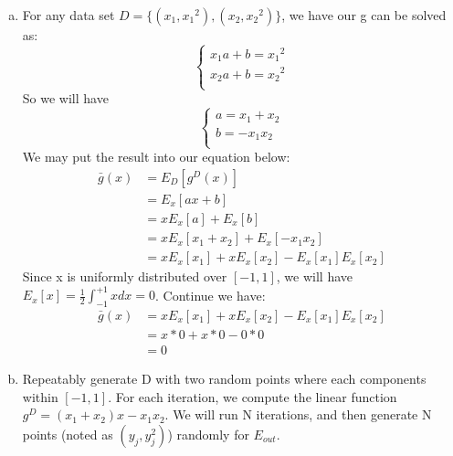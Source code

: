 \documentclass{article}
\def\math#1{$#1$}
\begin{document}
\begin{enumerate}[a)]
    \item For any data set \math{D = \{(x_1, {x_1}^2), (x_2, {x_2}^2)\}}, we have our g can be solved as:
         \begin{equation}
                \begin{cases}
                    x_1a + b = {x_1}^2 \\
                    x_2a + b = {x_2}^2 \\
                \end{cases}   
            \end{equation}
    So we will have 
         \begin{equation}
                \begin{cases}
                    a = x_1 + x_2 \\
                    b = -x_1x_2 \\
                \end{cases}   
            \end{equation}
    We may put the result into our equation below: 
        \begin{equation}
            \begin{split}
                \bar{g}(x) &= E_D[g^D(x)] \\
                &= E_x[ax+b] \\
                &= xE_x[a] + E_x[b] \\
                &= xE_x[x_1 + x_2] + E_x[-x_1x_2] \\
                &= xE_x[x_1] + xE_x[x_2] - E_x[x_1]E_x[x_2]
            \end{split}
        \end{equation}
        Since x is uniformly distributed over \math{[-1, 1]}, we will have \math{E_x[x] = \frac{1}{2}\int^{+1}_{-1}xdx = 0}. Continue we have:
         \begin{equation}
            \begin{split}
                \bar{g}(x) &= xE_x[x_1] + xE_x[x_2] - E_x[x_1]E_x[x_2] \\
                &= x * 0 + x * 0 - 0 * 0 \\
                &= 0
            \end{split}
        \end{equation}
    \item Repeatably generate D with two random points where each components within \math{[-1, 1]}. For each iteration, we compute the linear function \math{g^{D} = (x_1 + x_2)x - x_1x_2}. We will run N iterations, and then generate N points (noted as \math{(y_j, y_j^2)}) randomly for \math{E_{out}}. 

\end{enumerate}
\end{document}
